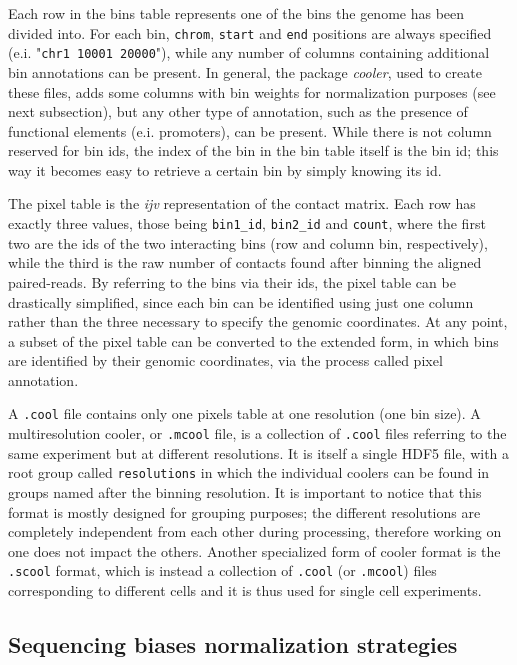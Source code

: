 Each row in the bins table represents one of the bins the genome has been divided into. For each bin, \texttt{chrom}, \texttt{start} and \texttt{end} positions are always specified (e.i. "\texttt{chr1  10001  20000}"), while any number of columns containing additional bin annotations can be present. In general, the package \emph{cooler}, used to create these files, adds some columns with bin weights for normalization purposes (see next subsection), but any other type of annotation, such as the presence of functional elements (e.i. promoters), can be present. While there is not column reserved for bin ids, the index of the bin in the bin table itself is the bin id; this way it becomes easy to retrieve a certain bin by simply knowing its id.

The pixel table is the \emph{ijv} representation of the contact matrix. Each row has exactly three values, those being \texttt{bin1\_id}, \texttt{bin2\_id} and \texttt{count}, where the first two are the ids of the two interacting bins (row and column bin, respectively), while the third is the raw number of contacts found after binning the aligned paired-reads. By referring to the bins via their ids, the pixel table can be drastically simplified, since each bin can be identified using just one column rather than the three necessary to specify the genomic coordinates. At any point, a subset of the pixel table can be converted to the extended form, in which bins are identified by their genomic coordinates, via the process called pixel annotation.

A \texttt{.cool} file contains only one pixels table at one resolution (one bin size). A multiresolution cooler, or \texttt{.mcool} file, is a collection of \texttt{.cool} files referring to the same experiment but at different resolutions. It is itself a single HDF5 file, with a root group called \texttt{resolutions} in which the individual coolers can be found in groups named after the binning resolution. It is important to notice that this format is mostly designed for grouping purposes; the different resolutions are completely independent from each other during processing, therefore working on one does not impact the others. Another specialized form of cooler format is the \texttt{.scool} format, which is instead a collection of \texttt{.cool} (or \texttt{.mcool}) files corresponding to different cells and it is thus used for single cell experiments. 


\subsection{Sequencing biases normalization strategies}

